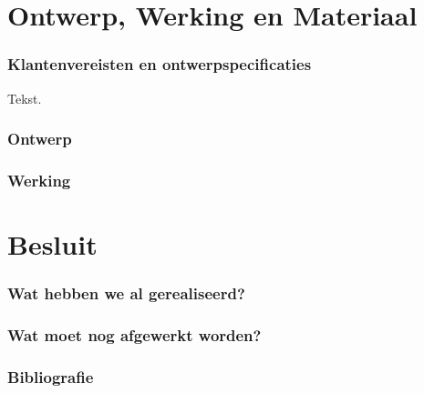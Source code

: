\documentclass
   [kulak] %
   {kulakbeamer}
\begin{document}





\section[Ontwerp]{Ontwerp, Werking en Materiaal}

\begin{frame}
\frametitle{Klantenvereisten en ontwerpspecificaties}
Tekst.
\end{frame}

\begin{frame}
\frametitle{Ontwerp}
\end{frame}

\begin{frame}
\frametitle{Werking}
\end{frame}





\section{Besluit}
\begin{frame}
\frametitle{Wat hebben we al gerealiseerd?}
\end{frame}

\begin{frame}
\frametitle{Wat moet nog afgewerkt worden?}

\end{frame}

\begin{frame}
\frametitle{Bibliografie}

\end{frame}
\end{document}
